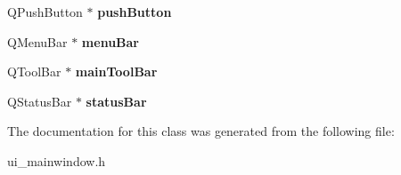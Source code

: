 \begin{DoxyCompactItemize}
Q\+Push\+Button $\ast$ {\bfseries push\+Button}
\item 
\mbox{\label{class_ui___main_window_a2be1c24ec9adfca18e1dcc951931457f}} 
Q\+Menu\+Bar $\ast$ {\bfseries menu\+Bar}
\item 
\mbox{\label{class_ui___main_window_a5172877001c8c7b4e0f6de50421867d1}} 
Q\+Tool\+Bar $\ast$ {\bfseries main\+Tool\+Bar}
\item 
\mbox{\label{class_ui___main_window_a50fa481337604bcc8bf68de18ab16ecd}} 
Q\+Status\+Bar $\ast$ {\bfseries status\+Bar}
\end{DoxyCompactItemize}


The documentation for this class was generated from the following file\+:\begin{DoxyCompactItemize}
\item 
ui\+\_\+mainwindow.\+h\end{DoxyCompactItemize}

